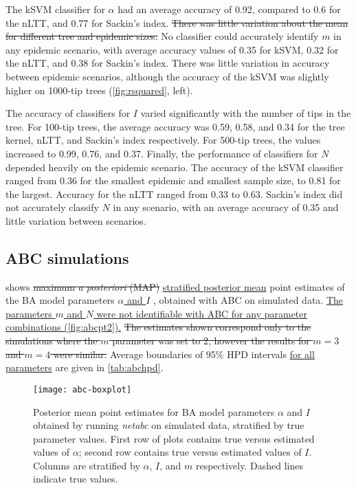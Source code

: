 \documentclass[12pt]{article}\usepackage[]{graphicx}\usepackage[]{color}
\let\mref\cref
\let\Mref\Cref
\renewcommand{\cref}[1]{\mbox{\mref{#1}}}
\renewcommand{\Cref}[1]{\mbox{\Mref{#1}}}
\newcommand{\add}[1]{\color{blue} \uline{#1} \color{black}}
\newcommand{\del}[1]{\color{red} \sout{#1} \color{black}}
\begin{document}
The kSVM classifier for $\alpha$ had an average accuracy of 
    0.92,
compared to 
    0.6
for the nLTT, and
    0.77
for Sackin's index. \del{There was little variation about the mean for
different tree and epidemic sizes.} No classifier could accurately identify $m$
in any epidemic scenario, with average accuracy values of 
  0.35 for kSVM,
  0.32 for the nLTT, and
  0.38
for Sackin's index. There was little variation in accuracy between epidemic
scenarios, although the accuracy of the kSVM was slightly higher on 1000-tip
trees (\cref{fig:rsquared}, left).

The accuracy of classifiers for $I$ varied significantly with the number of
tips in the tree. For 100-tip trees, the average accuracy was
  0.59,
  0.58, and
  0.34
for the tree kernel, nLTT, and Sackin's index respectively.
For 500-tip
trees, the values increased to
  0.99,
  0.76, and
  0.37.
Finally, the performance of classifiers for $N$ depended heavily on the
epidemic scenario. The accuracy of the kSVM classifier ranged from
  0.36
for the smallest epidemic and smallest sample size, to
  0.81
for the largest. Accuracy for the nLTT ranged from 
  0.33
to
  0.63.
Sackin's index did not accurately classify $N$ in any scenario, with an average
accuracy of
  0.35
and little variation between scenarios.

\subsection*{ABC simulations}



 shows \del{maximum \textit{a posteriori} (MAP)}
\add{stratified posterior mean} point estimates of the BA model parameters
\add{$\alpha$ and $I$}, obtained with ABC on simulated data. \add{The
parameters $m$ and $N$ were not identifiable with ABC for any parameter
combinations (\cref{fig:abcpt2}).} \del{The estimates shown correspond only to
the simulations where the $m$ parameter was set to 2, however the results for
$m = 3$ and $m = 4$ were similar.} Average boundaries of 95\% HPD intervals
\add{for all parameters} are given in \cref{tab:abchpd}.

\begin{figure}[ht]
    \centering
    \texttt{[image: abc-boxplot]}
    \caption[
        Posterior mean point estimates for BA model parameters $\alpha$ and $I$
        obtained by running \textit{netabc} on simulated data, stratified by
        true parameter values.
    ]{
        Posterior mean point estimates for BA model parameters $\alpha$ and $I$
        obtained by running \textit{netabc} on simulated data, stratified by
        true parameter values. First row of plots contains true versus
        estimated values of $\alpha$; second row contains true versus estimated
        values of $I$. Columns are stratified by $\alpha$, $I$, and $m$
        respectively. Dashed lines indicate true values. 
    }
    \label{fig:abcpt}
\end{figure}
\end{document}
